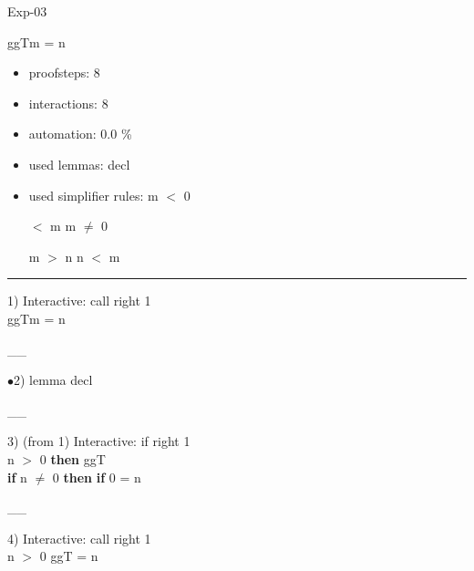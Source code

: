 \documentclass[a4paper]{article}
\begin{document}
\raggedright
              



\begin{minipage}{\textwidth}
\begin{center}

\end{center}
\end{minipage}

\vspace{5ex}

{\Huge Exp-03}

\vspace{5ex}

 \Fol \Do ggT\Dc m = n

\begin{itemize}
\item proofsteps: 8
\item interactions: 8
\item automation: 0.0 \%
\item used lemmas: decl 
\item used simplifier rules:
 \Fol \Not m $<$ 0

  $<$ m \Equiv m $\neq$ 0

 \Fol m $>$ n \Equiv n $<$ m



               \end{itemize}



\vspace{3ex}\rule{1\textwidth}{1mm}


1) Interactive: call right  1\\
 \Fol \Do ggT\Dc m = n

\vspace{-1.5ex}\_\hrulefill \_

$\bullet$2) lemma decl \\
 \Fol 

\vspace{-1.5ex}\_\hrulefill \_

3)  (from 1) Interactive: if right  1\\
\Fol {} n $>$ 0 {\bf then} ggT \\
 \tabf {} {\bf if} n $\neq$ 0 {\bf then} {\bf if} 0 %
{} = n

\vspace{-1.5ex}\_\hrulefill \_

4) Interactive: call right  1\\
n $>$ 0 \Fol \Do ggT\Dc {} = n
\end{document}
